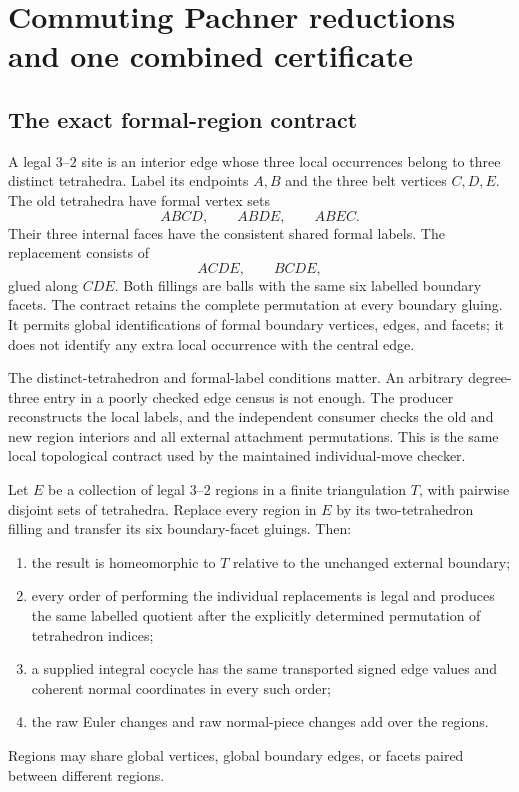 \section{Commuting Pachner reductions and one combined certificate}
\label{sec:batches}

\subsection{The exact formal-region contract}

A legal $3$--$2$ site is an interior edge whose three local occurrences
belong to three distinct tetrahedra. Label its endpoints $A,B$ and the
three belt vertices $C,D,E$. The old tetrahedra have formal vertex sets
\[
 ABCD,\qquad ABDE,\qquad ABEC.
\]
Their three internal faces have the consistent shared formal labels.
The replacement consists of
\[
 ACDE,\qquad BCDE,
\]
glued along $CDE$. Both fillings are balls with the same six labelled
boundary facets. The contract retains the complete permutation at every
boundary gluing. It permits global identifications of formal boundary
vertices, edges, and facets; it does not identify any extra local
occurrence with the central edge.

The distinct-tetrahedron and formal-label conditions matter. An arbitrary
degree-three entry in a poorly checked edge census is not enough. The
producer reconstructs the local labels, and the independent consumer
checks the old and new region interiors and all external attachment
permutations. This is the same local topological contract used by the
maintained individual-move checker.

\begin{theorem}
\label{thm:commuting}
Let $E$ be a collection of legal $3$--$2$ regions in a finite triangulation
$T$, with pairwise disjoint sets of tetrahedra. Replace every region in
$E$ by its two-tetrahedron filling and transfer its six boundary-facet
gluings. Then:
\begin{enumerate}[label=(\roman*)]
\item the result is homeomorphic to $T$ relative to the unchanged
external boundary;
\item every order of performing the individual replacements is legal
and produces the same labelled quotient after the explicitly determined
permutation of tetrahedron indices;
\item a supplied integral cocycle has the same transported signed edge
values and coherent normal coordinates in every such order;
\item the raw Euler changes and raw normal-piece changes add over the
regions.
\end{enumerate}
Regions may share global vertices, global boundary edges, or facets
paired between different regions.
\end{theorem}

